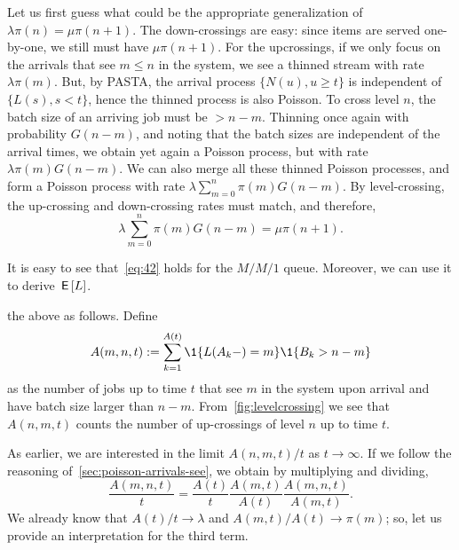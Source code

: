 Let us first guess what could be the appropriate generalization of $\lambda \pi(n) = \mu \pi(n+1)$.
The down-crossings are easy: since items are served one-by-one, we still must have $\mu \pi(n+1)$.
For the upcrossings, if we only focus on the arrivals that see $m\leq n$ in the system, we see a thinned stream
 with rate $\lambda \pi(m)$.
But, by PASTA, the arrival process $\{N(u), u\geq t\}$ is independent of $\{L(s), s< t\}$, hence the thinned process is also Poisson.
To cross level $n$, the batch size of an arriving job must be $>n-m$.
Thinning once again with probability $G(n-m)$, and noting that the batch sizes are independent of the arrival times, we obtain  yet again a Poisson process, but with rate $\lambda \pi(m) G(n-m)$.
We can also merge all these thinned Poisson processes, and form a Poisson process with rate $\lambda \sum_{m=0}^n \pi(m) G(n-m)$.
By level-crossing, the up-crossing and down-crossing rates must match, and therefore,
\begin{equation}\label{eq:42}
\lambda \sum_{m=0}^n \pi(m) G(n-m) = \mu \pi(n+1).
\end{equation}

It is easy to see that~\cref{eq:42} holds for the $M/M/1$ queue.
Moreover, we can use it to derive $\,\mathsf{E}\left[L\right]$.

 the above as follows.
Define
\begin{equation*}
 A(m,n,t) := \sum_{k=1}^{A(t)}\1{\L(A_k-) = m}\1{B_k > n-m}
\end{equation*}
as the number of jobs up to time $t$ that see $m$ in the system upon arrival and have batch size larger than $n-m$.
From~\cref{fig:levelcrossing} we see that $A(n,m,t)$ counts the number of up-crossings of level $n$ up to time $t$.

As earlier, we are interested in the limit $A(n,m,t)/t$ as $t\to\infty$.
If we follow the reasoning of~\cref{sec:poisson-arrivals-see}, we obtain by multiplying and dividing,
\begin{equation}\label{eq:16}
 \frac{A(m,n,t)}t = \frac{A(t)}t \frac{A(m,t)}{A(t)}\frac{A(m,n,t)}{A(m,t)}.
\end{equation}
We already know that $A(t)/t\to\lambda$ and $A(m,t)/A(t)\to\pi(m)$; so, let us  provide  an interpretation for the third term.

